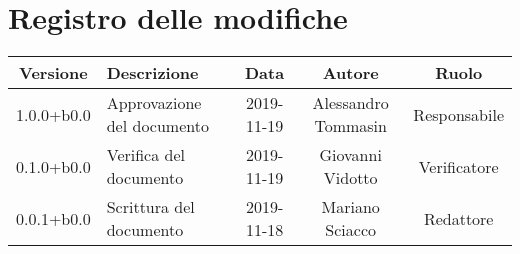 \section*{Registro delle modifiche}

\begin{center}
	\begin{longtable}{|c|p{3cm}|c|c|c|}
	\hline
	\rowcolor{lighter-grayer}
	\textbf{Versione} & \textbf{Descrizione} & \textbf{Data} & \textbf{Autore} & \textbf{Ruolo} \\
	\hline
	\endfirsthead


	1.0.0+b0.0 & Approvazione del documento & 2019-11-19 & Alessandro Tommasin & Responsabile \\
	\hline
	0.1.0+b0.0 & Verifica del documento & 2019-11-19 & Giovanni Vidotto & Verificatore \\
	\hline
	0.0.1+b0.0 & Scrittura del documento & 2019-11-18 & Mariano Sciacco & Redattore \\

	\hline

	\end{longtable}
\end{center}
